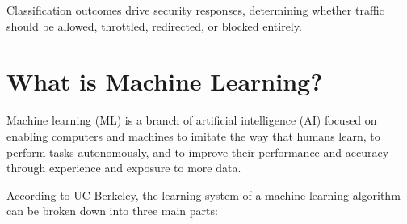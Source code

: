 \documentclass{report}
\begin{document}
  


Classification outcomes drive security responses, determining whether traffic should be allowed, throttled, redirected, or blocked entirely.

\section*{What is Machine Learning?}

Machine learning (ML) is a branch of artificial intelligence (AI) focused on enabling computers and machines to imitate the way that humans learn, to perform tasks autonomously, and to improve their performance and accuracy through experience and exposure to more data.

According to UC Berkeley, the learning system of a machine learning algorithm can be broken down into three main parts:
\end{document}
